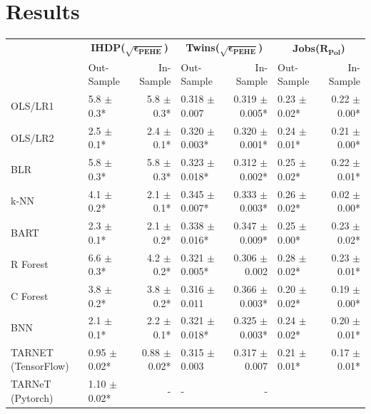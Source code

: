 \documentclass{amia}
\begin{document}
\section*{Results}
\begin{table}[h]
\fontsize{7.6pt}{0.35cm}\selectfont
\centering
\begin{tabular}{p{1.5cm}|l r|l r|l r}
\toprule 
      & \multicolumn{2}{c}{\textbf{IHDP($\boldsymbol{\sqrt{\epsilon_{PEHE}}}$)}} & \multicolumn{2}{|c}{\textbf{Twins($\boldsymbol{\sqrt{\epsilon_{PEHE}}}$)}} 
      & \multicolumn{2}{|c}{\textbf{Jobs($\boldsymbol{R_{Pol}}$)}}\\
      & Out-Sample & In-Sample 
      & Out-Sample & In-Sample
      & Out-Sample & In-Sample\\
\midrule 
      OLS/LR1   & 5.8 $\pm$ 0.3* & 5.8 $\pm$ 0.3*  & 0.318 $\pm$ 0.007 & 0.319 $\pm$ 0.005*
      & 0.23 $\pm$ 0.02* & 0.22 $\pm$ 0.00*\\
      OLS/LR2   & 2.5 $\pm$ 0.1* & 2.4 $\pm$ 0.1*  & 0.320 $\pm$ 0.003* & 0.320 $\pm$ 0.001*
      & 0.24 $\pm$ 0.01* & 0.21 $\pm$ 0.00*\\
      BLR       & 5.8 $\pm$ 0.3* & 5.8 $\pm$ 0.3*  & 0.323 $\pm$ 0.018* & 0.312 $\pm$ 0.002*
      & 0.25 $\pm$ 0.02* & 0.22 $\pm$ 0.01*\\
      k-NN      & 4.1 $\pm$ 0.2* & 2.1 $\pm$ 0.1*  & 0.345 $\pm$ 0.007* & 0.333 $\pm$ 0.003*
      & 0.26 $\pm$ 0.02* & 0.02 $\pm$ 0.00*\\
\midrule 
      BART      & 2.3 $\pm$ 0.1* & 2.1 $\pm$ 0.2* & 0.338 $\pm$ 0.016* & 0.347 $\pm$ 0.009*
      & 0.25 $\pm$ 0.00* & 0.23 $\pm$ 0.02*\\
      R Forest  & 6.6 $\pm$ 0.3* & 4.2 $\pm$ 0.2* & 0.321 $\pm$ 0.005* & 0.306 $\pm$ 0.002
      & 0.28 $\pm$ 0.02* & 0.23 $\pm$ 0.01*\\
      C Forest  & 3.8 $\pm$ 0.2* & 3.8 $\pm$ 0.2* & 0.316 $\pm$ 0.011 & 0.366 $\pm$ 0.003*
      & 0.20 $\pm$ 0.02* & 0.19 $\pm$ 0.00*\\
\midrule 
      BNN      & 2.1 $\pm$ 0.1* & 2.2 $\pm$ 0.1* & 0.321 $\pm$ 0.018* & 0.325 $\pm$ 0.003*
      & 0.24 $\pm$ 0.02* & 0.20 $\pm$ 0.01*\\
      TARNET (TensorFlow)   & 0.95 $\pm$ 0.02* & 0.88 $\pm$ 0.02* & 0.315 $\pm$ 0.003 & 0.317 $\pm$ 0.007
      & 0.21 $\pm$ 0.01* & 0.17 $\pm$ 0.01*\\
      TARNeT (Pytorch)   & 1.10 $\pm$ 0.02* & - & - & -

\end{tabular}
\end{table}
\end{document}
